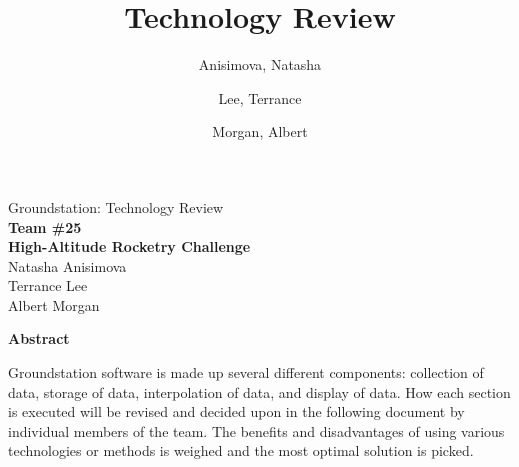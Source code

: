\documentclass[10pt,draftclsnofoot,onecolumn]{IEEEtran}
\begin{document}
	\singlespace
	
	\title{\vspace{2in}Technology Review}
	
	\author {
		Anisimova, Natasha
		\and
		Lee, Terrance
		\and
		Morgan, Albert
	}
	
	
	\pagestyle{empty}
	\vspace*{2in}
	\begin{center}
		\huge
		Groundstation: Technology Review\\
		\normalsize
		\vspace{5mm}
		\textbf{
			Team \#25\\
			High-Altitude Rocketry Challenge\\
		}
		\vspace{1mm}
		Natasha Anisimova\\
		Terrance Lee\\
		Albert Morgan
	\end{center}
	
	\vspace{5mm}
	
	\begin{center}
		\textbf{Abstract}
	\end{center}
	
	
	Groundstation software is made up several different components: collection of data, storage of data, interpolation of data, and 
	display of data. 
	How each section is executed will be revised and decided upon in the following document by individual members of the team. 
	The benefits and disadvantages of using various technologies or methods is weighed and the most optimal solution is picked.
	
	
	\newpage
	
	
\end{document}
